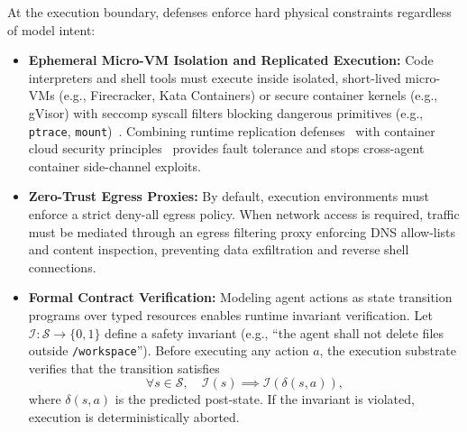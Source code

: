 At the execution boundary, defenses enforce hard physical constraints regardless of model intent:
\begin{itemize}
    \item \textbf{Ephemeral Micro-VM Isolation and Replicated Execution:} Code interpreters and shell tools must execute inside isolated, short-lived micro-VMs (e.g., Firecracker, Kata Containers) or secure container kernels (e.g., gVisor) with seccomp syscall filters blocking dangerous primitives (e.g., \texttt{ptrace}, \texttt{mount})~\cite{liu2024demystifying}. Combining runtime replication defenses~\cite{salamat2011runtime} with container cloud security principles~\cite{jin2019dseom, gao2021a} provides fault tolerance and stops cross-agent container side-channel exploits.
    \item \textbf{Zero-Trust Egress Proxies:} By default, execution environments must enforce a strict deny-all egress policy. When network access is required, traffic must be mediated through an egress filtering proxy enforcing DNS allow-lists and content inspection, preventing data exfiltration and reverse shell connections.
    \item \textbf{Formal Contract Verification:} Modeling agent actions as state transition programs over typed resources enables runtime invariant verification. Let $\mathcal{I}: \mathcal{S} \to \{0, 1\}$ define a safety invariant (e.g., ``the agent shall not delete files outside \texttt{/workspace}''). Before executing any action $a$, the execution substrate verifies that the transition satisfies
    \begin{equation}
        \forall s \in \mathcal{S}, \quad \mathcal{I}(s) \implies \mathcal{I}(\delta(s, a)),
    \end{equation}
    where $\delta(s, a)$ is the predicted post-state. If the invariant is violated, execution is deterministically aborted.
\end{itemize}
